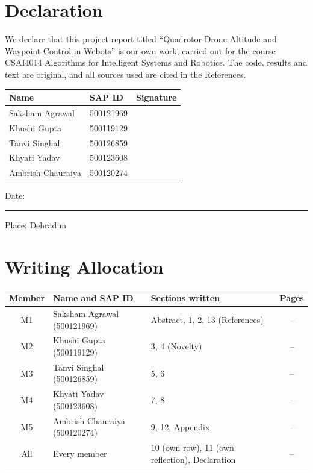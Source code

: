 \documentclass[12pt,a4paper]{article}
\providecommand{\pagesMone}{--}\providecommand{\pagesMtwo}{--}\providecommand{\pagesMthree}{--}
\providecommand{\pagesMfour}{--}\providecommand{\pagesMfive}{--}
\begin{document}
\setcounter{page}{1}
\section*{Declaration}
We declare that this project report titled ``Quadrotor Drone Altitude and Waypoint Control in Webots'' is our own work, carried out for the course CSAI4014 Algorithms for Intelligent Systems and Robotics. The code, results and text are original, and all sources used are cited in the References.

\vspace{1cm}
\renewcommand{\arraystretch}{2.2}
\begin{tabular}{|P{5.2cm}|P{3cm}|P{4.5cm}|}
\hline
\textbf{Name} & \textbf{SAP ID} & \textbf{Signature} \\ \hline
Saksham Agrawal & 500121969 & \\ \hline
Khushi Gupta & 500119129 & \\ \hline
Tanvi Singhal & 500126859 & \\ \hline
Khyati Yadav & 500123608 & \\ \hline
Ambrish Chauraiya & 500120274 & \\ \hline
\end{tabular}
\renewcommand{\arraystretch}{1.2}

\vspace{0.8cm}
Date: \rule{4cm}{0.4pt} \hfill Place: Dehradun
\newpage


\newpage

\setcounter{tocdepth}{1}
\tableofcontents
\newpage
\listoffigures
{}
\listoftables
{}
\vspace{3mm}
\section*{Writing Allocation}
\renewcommand{\arraystretch}{1.15}
\begin{tabular}{|c|P{4.6cm}|P{5.4cm}|c|}
\hline
\textbf{Member} & \textbf{Name and SAP ID} & \textbf{Sections written} & \textbf{Pages} \\ \hline
M1 & Saksham Agrawal (500121969) & Abstract, 1, 2, 13 (References) & \pagesMone \\ \hline
M2 & Khushi Gupta (500119129) & 3, 4 (Novelty) & \pagesMtwo \\ \hline
M3 & Tanvi Singhal (500126859) & 5, 6 & \pagesMthree \\ \hline
M4 & Khyati Yadav (500123608) & 7, 8 & \pagesMfour \\ \hline
M5 & Ambrish Chauraiya (500120274) & 9, 12, Appendix & \pagesMfive \\ \hline
All & Every member & 10 (own row), 11 (own reflection), Declaration & -- \\ \hline
\end{tabular}
\renewcommand{\arraystretch}{1.2}
\newpage
\end{document}
